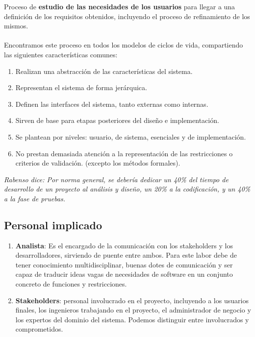 Proceso de \textbf{estudio de las necesidades de los usuarios} para llegar a una definición de los requisitos obtenidos, incluyendo el proceso de refinamiento de los mismos.
\\\\
Encontramos este proceso en todos los modelos de ciclos de vida, compartiendo las siguientes características comunes:
\begin{enumerate}
    \item Realizan una abstracción de las características del sistema.
    \item Representan el sistema de forma jerárquica.
    \item Definen las interfaces del sistema, tanto externas como internas. %
    \item Sirven de base para etapas posteriores del diseño e implementación.
    \item Se plantean por niveles: usuario, de sistema, esenciales y de implementación.
    \item No prestan demasiada atención a la representación de las restricciones o criterios de validación. (excepto los métodos formales).
\end{enumerate}

\textit{Rabenso dice: Por norma general, se debería dedicar un 40\% del tiempo de desarrollo de un proyecto al análisis y diseño, un 20\% a la codificación, y un 40\% a la fase de pruebas.}

\subsection{Personal implicado}

\begin{enumerate}
\item \textbf{Analista}: Es el encargado de la comunicación con los stakeholders y los desarrolladores, sirviendo de puente entre ambos. Para este labor debe de tener conocimiento multidisciplinar, buenas dotes de comunicación y ser capaz de traducir ideas vagas de necesidades de software en un conjunto concreto de funciones y restricciones.

\item \textbf{Stakeholders}: personal involucrado en el proyecto, incluyendo a los usuarios finales, los ingenieros trabajando en el proyecto, el administrador de negocio y los expertos del dominio del sistema. Podemos distinguir entre involucrados y comprometidos.
\end{enumerate}



